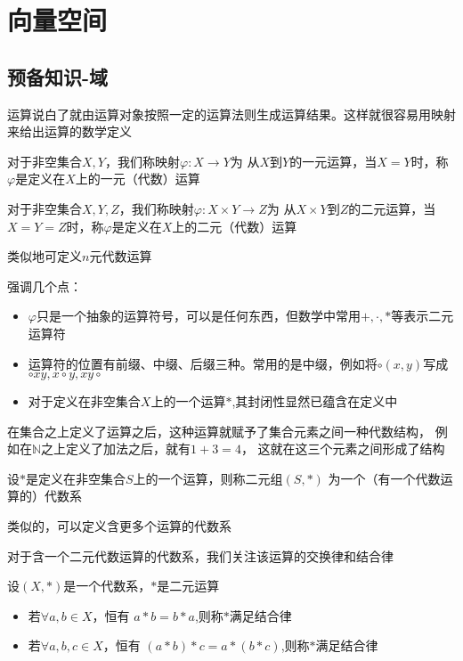 \chapter{向量空间}
\section{预备知识-域}
运算说白了就由运算对象按照一定的运算法则生成运算结果。这样就很容易用映射来给出运算的数学定义
\begin{definition}
    对于非空集合$X,Y$，我们称映射$\varphi : X\rightarrow Y $为
    从$X$到$Y$的一元运算，当$X=Y$时，称$\varphi$是定义在$X$上的一元（代数）运算
\end{definition}
\begin{definition}
    对于非空集合$X,Y,Z$，我们称映射$\varphi : X \times Y \rightarrow Z $为
    从$X\times Y$到$Z$的二元运算，当$X=Y=Z$时，称$\varphi$是定义在$X$上的二元（代数）运算
\end{definition}

类似地可定义$n$元代数运算

强调几个点：
\begin{itemize}
    \item $\varphi$只是一个抽象的运算符号，可以是任何东西，但数学中常用$+,\cdot, * $等表示二元运算符
    \item 运算符的位置有前缀、中缀、后缀三种。常用的是中缀，例如将$\circ(x,y)$写成$\circ x y,x \circ y, x y \circ$
    \item 对于定义在非空集合$X$上的一个运算$*$,其封闭性显然已蕴含在定义中
\end{itemize}

在集合之上定义了运算之后，这种运算就赋予了集合元素之间一种代数结构，
例如在$\mathbb{N}$之上定义了加法之后，就有$1+3=4$，
这就在这三个元素之间形成了结构
\begin{definition}
    设$*$是定义在非空集合$S$上的一个运算，则称二元组$(S,*)$
    为一个（有一个代数运算的）代数系
\end{definition}

类似的，可以定义含更多个运算的代数系

对于含一个二元代数运算的代数系，我们关注该运算的交换律和结合律
\begin{definition}
    设$(X,*)$是一个代数系，$*$是二元运算
    \begin{itemize}
        \item 若$\forall a,b \in X$，恒有
        $a*b=b*a$,则称$*$满足结合律
        \item 若$\forall a,b,c \in X$，恒有
        $(a*b)*c=a*(b*c)$,则称$*$满足结合律
    \end{itemize}
\end{definition}

